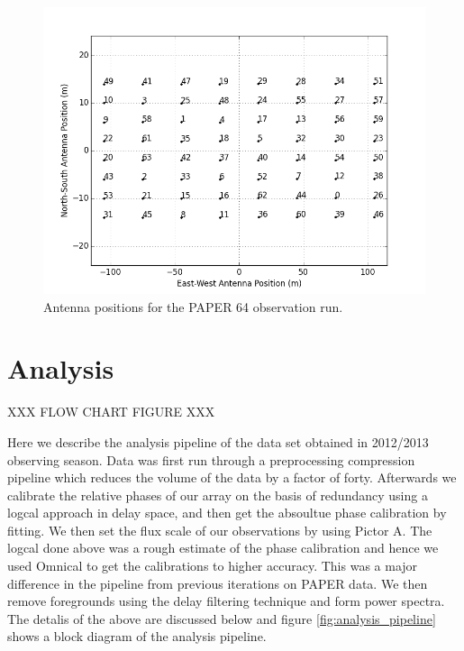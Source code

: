 \documentclass[twocolumn,numberedappendix]{emulateapj}
\begin{document}
\begin{figure}[!t]\centering
\includegraphics[width=1.85\columnwidth,height=\columnwidth]{plots/antenna_positions.png}
\caption{Antenna positions for the PAPER 64 observation run.}
\label{fig:antenna_positions}
\end{figure}


\section{Analysis}
XXX FLOW CHART FIGURE XXX

Here we describe the analysis pipeline of the data set obtained in 2012/2013
observing season. 
Data was first run through a preprocessing compression pipeline which reduces
the volume of the data by a factor of forty. Afterwards we calibrate the
relative phases of our array on the basis of redundancy using a logcal approach
in delay space, and then get the absoultue phase calibration by fitting. We then
set the flux scale of our observations by using Pictor A. The logcal done above
was a rough estimate of the phase calibration and hence we used Omnical to get
the calibrations to higher accuracy. This was a major difference in the pipeline
from previous iterations on PAPER data. We then remove foregrounds using the
delay filtering technique and form power spectra. The detalis of the above are
discussed below and figure \ref{fig:analysis_pipeline} shows a block diagram of
the analysis pipeline.
\end{document}
